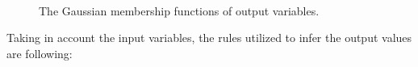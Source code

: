 \begin{figure}[ht!]
   \captionsetup{font=footnotesize}
   \centering
        \hspace{0.1\linewidth}
    \\
   \caption{The Gaussian membership functions of output variables.
   }
   \label{fig:fis-outputs} 
\end{figure}
Taking in account the input variables, the rules utilized to infer the 
output values are following:
